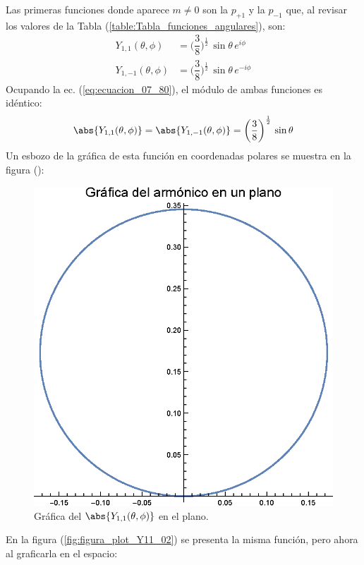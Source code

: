 Las primeras funciones donde aparece $m \neq 0$ son la $p_{+1}$ y la $p_{-1}$ que, al revisar los valores de la Tabla (\ref{table:Tabla_funciones_angulares}), son:
\begin{align}
Y_{1, 1} (\theta, \phi) &= \bigg( \dfrac{3}{8} \bigg)^{\frac{1}{2}} \, \sin \theta \, e^{i \phi} \label{eq:ecuacion_07_81} \\[0.5em]
Y_{1, -1} (\theta, \phi) &= \bigg( \dfrac{3}{8} \bigg)^{\frac{1}{2}} \, \sin \theta \, e^{-i \phi} \label{eq:ecuacion_07_82}
\end{align}
Ocupando la ec. (\ref{eq:ecuacion_07_80}), el módulo de ambas funciones es idéntico:
\begin{align}
\abs{Y_{1, 1} (\theta, \phi)} = \abs{Y_{1, -1} (\theta, \phi)} = \bigg( \dfrac{3}{8} \bigg)^{\frac{1}{2}} \, \sin \theta
\label{eq:ecuacion_07_83}
\end{align}
Un esbozo de la gráfica de esta función en coordenadas polares se muestra en la figura ():
\begin{figure}[H]
    \centering
    \includegraphics[scale=0.75]{Imagenes/Plot_Y11_01.eps}
    \caption{Gráfica del $\abs{Y_{1, 1} (\theta, \phi)}$ en el plano.}
    \label{fig:figura_plot_Y11_01}
\end{figure}
En la figura (\ref{fig:figura_plot_Y11_02}) se presenta la misma función, pero ahora al graficarla en el espacio:
